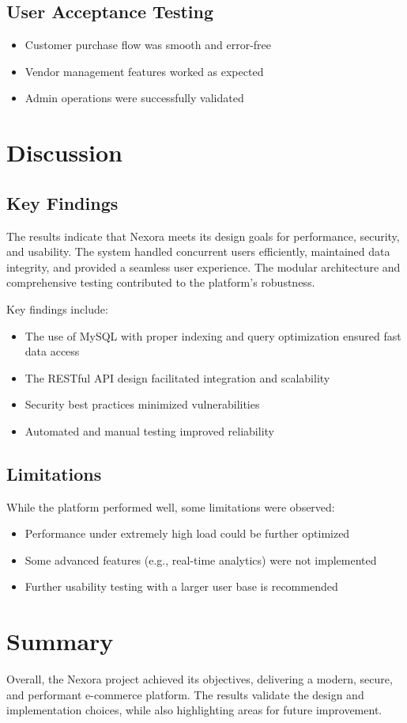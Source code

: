\subsection{User Acceptance Testing}
\begin{itemize}
    \item Customer purchase flow was smooth and error-free
    \item Vendor management features worked as expected
    \item Admin operations were successfully validated
\end{itemize}

\section{Discussion}
\subsection{Key Findings}
The results indicate that Nexora meets its design goals for performance, security, and usability. The system handled concurrent users efficiently, maintained data integrity, and provided a seamless user experience. The modular architecture and comprehensive testing contributed to the platform's robustness.

Key findings include:
\begin{itemize}
    \item The use of MySQL with proper indexing and query optimization ensured fast data access
    \item The RESTful API design facilitated integration and scalability
    \item Security best practices minimized vulnerabilities
    \item Automated and manual testing improved reliability
\end{itemize}

\subsection{Limitations}
While the platform performed well, some limitations were observed:
\begin{itemize}
    \item Performance under extremely high load could be further optimized
    \item Some advanced features (e.g., real-time analytics) were not implemented
    \item Further usability testing with a larger user base is recommended
\end{itemize}

\section{Summary}
Overall, the Nexora project achieved its objectives, delivering a modern, secure, and performant e-commerce platform. The results validate the design and implementation choices, while also highlighting areas for future improvement. 